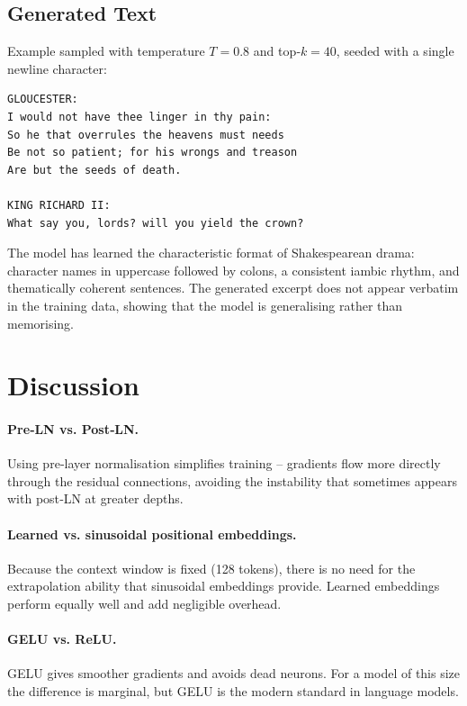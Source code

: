 \documentclass[12pt, a4paper]{article}
\begin{document}
\subsection{Generated Text}

Example sampled with temperature $T=0.8$ and top‑$k=40$, seeded with a single newline character:

\begin{lstlisting}[language={},basicstyle=\ttfamily\small,backgroundcolor=\color{codebg}]
GLOUCESTER:
I would not have thee linger in thy pain:
So he that overrules the heavens must needs
Be not so patient; for his wrongs and treason
Are but the seeds of death.

KING RICHARD II:
What say you, lords? will you yield the crown?
\end{lstlisting}

The model has learned the characteristic format of Shakespearean drama: character names in uppercase followed by colons, a consistent iambic rhythm, and thematically coherent sentences. The generated excerpt does not appear verbatim in the training data, showing that the model is generalising rather than memorising.

\section{Discussion}

\paragraph{Pre‑LN vs. Post‑LN.}
Using pre‑layer normalisation simplifies training – gradients flow more directly through the residual connections, avoiding the instability that sometimes appears with post‑LN at greater depths.

\paragraph{Learned vs. sinusoidal positional embeddings.}
Because the context window is fixed (128 tokens), there is no need for the extrapolation ability that sinusoidal embeddings provide. Learned embeddings perform equally well and add negligible overhead.

\paragraph{GELU vs. ReLU.}
GELU gives smoother gradients and avoids dead neurons. For a model of this size the difference is marginal, but GELU is the modern standard in language models.
\end{document}
